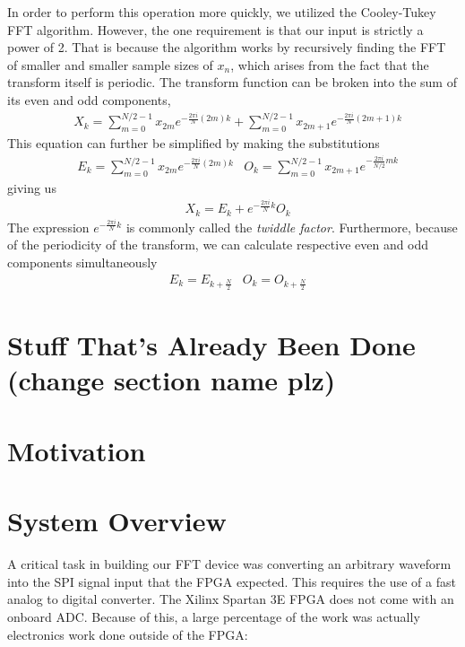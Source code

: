 \documentclass[12pt]{article}
\begin{document}
    In order to perform this operation more quickly, we utilized the Cooley-Tukey FFT algorithm.
    However, the one requirement is that our input is strictly a power of 2.
    That is because the algorithm works by recursively finding the FFT of smaller and smaller sample sizes of $x_n$, which arises from the fact that the transform itself is periodic.
    The transform function can be broken into the sum of its even and odd components,
    \begin{align*}
        &X_k = \sum \limits_{m=0}^{N/2-1} x_{2m}e^{-\frac{2\pi i}{N} (2m)k} + \sum \limits_{m=0}^{N/ 2-1} x_{2m+1} e^{-\frac{2\pi i}{N} (2m+1)k}
    \end{align*}
    This equation can further be simplified by making the substitutions
    \begin{align*}
        &E_k = \sum \limits_{m=0}^{N/2-1} x_{2m}e^{-\frac{2\pi i}{N} (2m)k}
        &O_k = \sum \limits_{m=0}^{N/2-1} x_{2m+1} e^{-\frac{2\pi i}{N/2} mk}
    \end{align*}
    giving us
    \begin{align*}
        &X_k = E_k + e^{-\frac{2\pi i}{N} k} O_k
    \end{align*}
    The expression $e^{-\frac{2\pi i}{N}k}$ is commonly called the \textit{twiddle factor}.
    Furthermore, because of the periodicity of the transform, we can calculate respective even and   odd components simultaneously
    \begin{align*}
        &E_k = E_{k+\frac{N}{2}}
        &O_k = O_{k+\frac{N}{2}}
    \end{align*}
  
  \section*{Stuff That's Already Been Done (change section name plz)}

  \section*{Motivation}

  \section*{System Overview}
    A critical task in building our FFT device was converting an arbitrary waveform into the SPI signal input that the FPGA expected. This requires the use of a fast analog to digital converter. The Xilinx Spartan 3E FPGA does not come with an onboard ADC. Because of this, a large percentage of the work was actually electronics work done outside of the FPGA:
\end{document}
